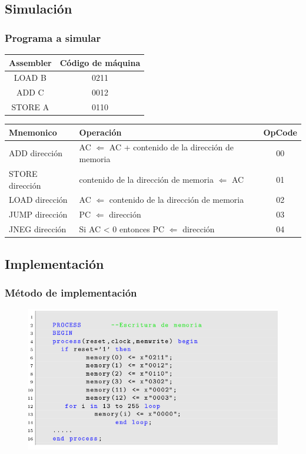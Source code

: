 \documentclass{beamer}
\begin{document}
\subsection{Simulación}
\begin{frame}
\frametitle{Programa a simular}   
\begin{table}[!hbt] 
\centering
\scriptsize{
 \begin{tabular}{|c|c|}
\hline
\textbf{Assembler} & \textbf{Código de máquina} \\ \hline
LOAD B & 0211 \\ \hline
ADD C & 0012 \\ \hline
STORE A & 0110 \\ \hline
\end{tabular}
}
\end{table}  

\begin{table}[!hbt] 
\centering
\scriptsize{
\begin{tabular}{|l|l|c|}
\hline
 \textbf{Mnemonico} & \textbf{Operación} & \textbf{OpCode}\\ \hline
ADD dirección & AC $\Leftarrow$ AC + contenido de la dirección de memoria & 00\\ \hline
STORE dirección& contenido de la dirección de memoria $\Leftarrow$ AC & 01\\ \hline
LOAD dirección& AC $\Leftarrow$ contenido de la dirección de memoria & 02\\ \hline
JUMP dirección& PC $\Leftarrow$ dirección & 03 \\ \hline
JNEG dirección& Si AC < 0 entonces PC $\Leftarrow$ dirección & 04 \\ \hline
\end{tabular}
}
\end{table}

\end{frame}

\subsection{Implementación}
  \begin{frame}
\frametitle{Método de implementación}
  \begin{figure}[h]
  \centering
    \includegraphics[width=1\textwidth]{graficos/implementacion.png}
  
\end{figure} 

  
  \end{frame}
\end{document}
